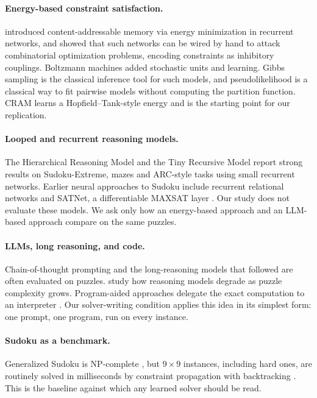 \documentclass{article} %
\begin{document}
\paragraph{Energy-based constraint satisfaction.}
\citet{hopfield1982neural} introduced content-addressable memory via energy minimization in recurrent networks, and \citet{hopfield1985neural} showed that such networks can be wired by hand to attack combinatorial optimization problems, encoding constraints as inhibitory couplings. Boltzmann machines \citep{ackley1985boltzmann} added stochastic units and learning. Gibbs sampling \citep{geman1984stochastic} is the classical inference tool for such models, and pseudolikelihood \citep{besag1975statistical} is a classical way to fit pairwise models without computing the partition function. CRAM \citep{hoover2026cram} learns a Hopfield--Tank-style energy and is the starting point for our replication.

\paragraph{Looped and recurrent reasoning models.}
The Hierarchical Reasoning Model \citep{wang2025hrm} and the Tiny Recursive Model \citep{jolicoeur2025trm} report strong results on Sudoku-Extreme, mazes and ARC-style tasks using small recurrent networks. Earlier neural approaches to Sudoku include recurrent relational networks \citep{palm2018recurrent} and SATNet, a differentiable MAXSAT layer \citep{wang2019satnet}. Our study does not evaluate these models. We ask only how an energy-based approach and an LLM-based approach compare on the same puzzles.

\paragraph{LLMs, long reasoning, and code.}
Chain-of-thought prompting \citep{wei2022cot} and the long-reasoning models that followed are often evaluated on puzzles. \citet{shojaee2025illusion} study how reasoning models degrade as puzzle complexity grows. Program-aided approaches delegate the exact computation to an interpreter \citep{gao2023pal,chen2022pot}. Our solver-writing condition applies this idea in its simplest form: one prompt, one program, run on every instance.

\paragraph{Sudoku as a benchmark.}
Generalized Sudoku is NP-complete \citep{yato2003complexity}, but $9\times 9$ instances, including hard ones, are routinely solved in milliseconds by constraint propagation with backtracking \citep{norvig2006sudoku}. This is the baseline against which any learned solver should be read.
\end{document}
